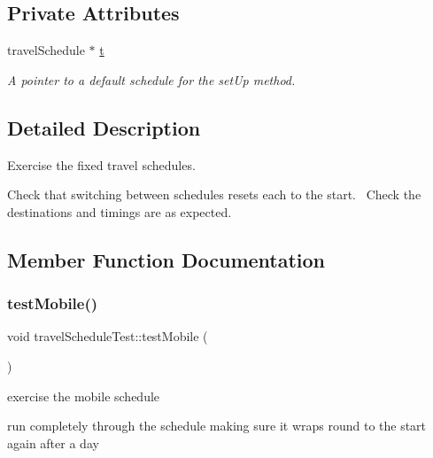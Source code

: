 \subsection*{Private Attributes}
\begin{DoxyCompactItemize}
\item 
\mbox{\label{classtravelScheduleTest_a98d861ced2b339627f69fd5d5f343743}} 
travel\+Schedule $\ast$ \mbox{\hyperlink{classtravelScheduleTest_a98d861ced2b339627f69fd5d5f343743}{t}}
\begin{DoxyCompactList}\small\item\em A pointer to a default schedule for the set\+Up method. \end{DoxyCompactList}\end{DoxyCompactItemize}


\subsection{Detailed Description}
Exercise the fixed travel schedules. 

Check that switching between schedules resets each to the start.~\newline
Check the destinations and timings are as expected. 

\subsection{Member Function Documentation}
\mbox{\label{classtravelScheduleTest_a7d457e4ae5c44853c450860284993a57}} 
\subsubsection{\texorpdfstring{test\+Mobile()}{testMobile()}}
{\footnotesize\ttfamily void travel\+Schedule\+Test\+::test\+Mobile (\begin{DoxyParamCaption}{ }\end{DoxyParamCaption})\hspace{0.3cm}{\ttfamily [inline]}}



exercise the mobile schedule 

run completely through the schedule making sure it wraps round to the start again after a day ~\newline
\mbox{\label{classtravelScheduleTest_afa04fc9d3f86668e36c74a1f27c2d5aa}} 

